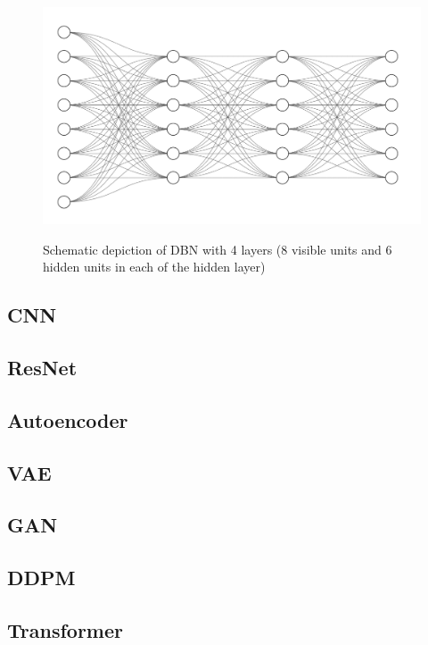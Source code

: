 \documentclass{myclass}
\begin{document}
\begin{figure}[ht]
   \centering
   \includegraphics[width=0.85\columnwidth]{figs/dbn.png}
   \label{fig:dbn}
   \caption{Schematic depiction of DBN with 4 layers (8 visible units and 6 hidden units in each of the hidden layer)}
\end{figure}

\subsection{CNN}
\subsection{ResNet}
\subsection{Autoencoder}
\subsection{VAE}
\subsection{GAN}
\subsection{DDPM}
\subsection{Transformer}


\end{document}

